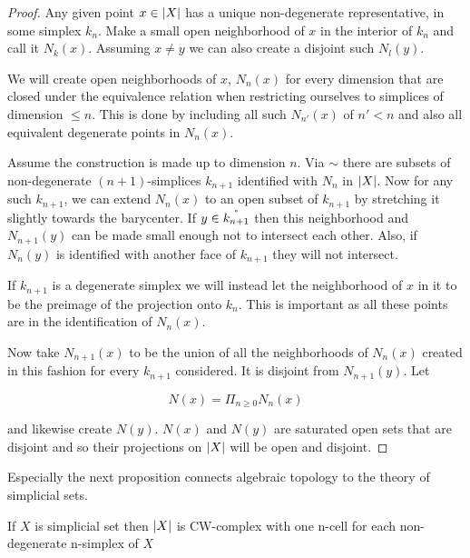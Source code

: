 \documentclass[../../main.tex]{subfiles}
\begin{document}
    \begin{proof}
        Any given point $x \in \geom[X]$ has a unique non-degenerate representative, in some simplex $k_n$. Make a small open neighborhood of $x$ in the interior of $k_n$ and call it $N_k(x)$. Assuming $x \neq y$ we can also create a disjoint such $N_l(y)$.
        
        We will create open neighborhoods of $x$, $N_n(x)$ for every dimension that are closed under the equivalence relation when restricting ourselves to simplices of dimension $\leq n$. This is done by including all such $N_{n'}(x)$ of $n' < n$ and also all equivalent degenerate points in $N_n(x)$.
        
        Assume the construction is made up to dimension $n$. Via $\sim$ there are subsets of non-degenerate $(n+1)$-simplices $k_{n+1}$ identified with $N_n$ in $\geom[X]$. Now for any such $k_{n+1}$, we can extend $N_n(x)$ to an open subset of $k_{n+1}$ by stretching it slightly towards the barycenter. If $y \in \interior{k_{n+1}}$ then this neighborhood and $N_{n+1}(y)$ can be made small enough not to intersect each other. Also, if $N_{n}(y)$ is identified with another face of $k_{n+1}$ they will not intersect.

        If $k_{n+1}$ is a degenerate simplex we will instead let the neighborhood of $x$ in it to be the preimage of the projection onto $k_n$. This is important as all these points are in the identification of $N_n(x)$.

        Now take $N_{n+1}(x)$ to be the union of all the neighborhoods of $N_n(x)$ created in this fashion for every $k_{n+1}$ considered. It is disjoint from $N_{n+1}(y)$. Let

        \begin{equation*}
            N(x) = \Pi_{n \geq 0} N_n(x)
        \end{equation*}

        and likewise create $N(y)$. $N(x)$ and $N(y)$ are saturated open sets that are disjoint and so their projections on $\geom[X]$ will be open and disjoint.
    \end{proof}
    
    Especially the next proposition connects algebraic topology to the theory of simplicial sets.

    \begin{proposition}\label{is-CW}
        If $X$ is simplicial set then $\geom[X]$ is CW-complex with one n-cell for each non-degenerate n-simplex of $X$ 
    \end{proposition}
\end{document}
